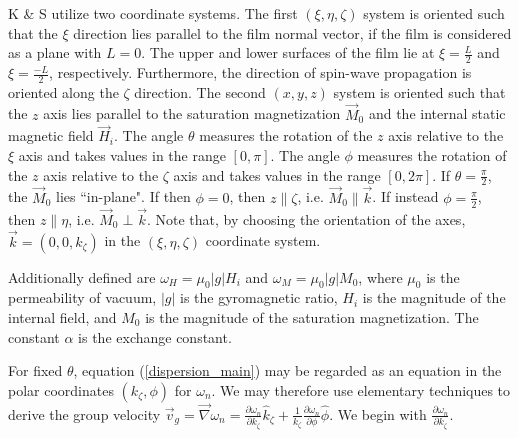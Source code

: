 \documentclass{article}
\begin{document}
K \& S utilize two coordinate systems. The first $(\xi,\eta,\zeta)$ system is oriented such that the $\xi$ direction lies parallel to the film normal vector, if the film is considered as a plane with $L=0$. The upper and lower surfaces of the film lie at $\xi = \frac{L}{2}$ and $\xi = \frac{-L}{2}$, respectively. Furthermore, the direction of spin-wave propagation is oriented along the $\zeta$ direction. The second $(x,y,z)$ system is oriented such that the $z$ axis lies parallel to the saturation magnetization $\vec{M}_{0}$ and the internal static magnetic field $\vec{H}_{i}$. The angle $\theta$ measures the rotation of the $z$ axis relative to the $\xi$ axis and takes values in the range $[0,\pi]$. The angle $\phi$ measures the rotation of the $z$ axis relative to the $\zeta$ axis and takes values in the range $[0, 2 \pi]$. If $\theta = \frac{\pi}{2}$, the $\vec{M}_{0}$ lies ``in-plane". If then $\phi = 0$, then $z \parallel \zeta$, i.e. $\vec{M}_{0} \parallel \vec{k}$. If instead $\phi = \frac{\pi}{2}$, then $z \parallel \eta$, i.e. $\vec{M}_{0} \perp \vec{k}$. Note that, by choosing the orientation of the axes, $\vec{k} = (0,0,k_{\zeta})$ in the $(\xi,\eta,\zeta)$ coordinate system.

Additionally defined are $\omega_{H} = \mu_{0} |g| H_{i}$ and $\omega_{M} = \mu_{0} |g| M_{0}$, where $\mu_{0}$ is the permeability of vacuum, $|g|$ is the gyromagnetic ratio, $H_{i}$ is the magnitude of the internal field, and $M_{0}$ is the magnitude of the saturation magnetization. The constant $\alpha$ is the exchange constant.

For fixed $\theta$, equation (\ref{dispersion_main}) may be regarded as an equation in the polar coordinates $(k_{\zeta},\phi)$ for $\omega_{n}$. We may therefore use elementary techniques to derive the group velocity $\vec{v}_{g} = \vec{\nabla} \omega_{n} = \frac{\partial \omega_{n}}{\partial k_{\zeta}} \hat{k}_{\zeta} + \frac{1}{k_{\zeta}} \frac{\partial \omega_{n}}{\partial \phi} \hat{\phi}$. We begin with $\frac{\partial \omega_{n}}{\partial k_{\zeta}}$.
\end{document}
